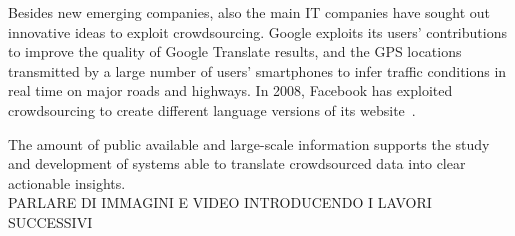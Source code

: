 Besides new emerging companies, also the main IT companies have sought out innovative ideas to exploit crowdsourcing. Google exploits its users' contributions to improve the quality of Google Translate results, and the GPS locations transmitted by a large number of users' smartphones to infer traffic conditions in real time on major roads and highways. 
In 2008, Facebook has exploited crowdsourcing to create different language versions of its website~\cite{dolmaya2011ethics}. %

The amount of public available and large-scale information supports the study and development of systems able to translate crowdsourced data into clear actionable insights.
\\PARLARE DI IMMAGINI E VIDEO INTRODUCENDO I LAVORI SUCCESSIVI